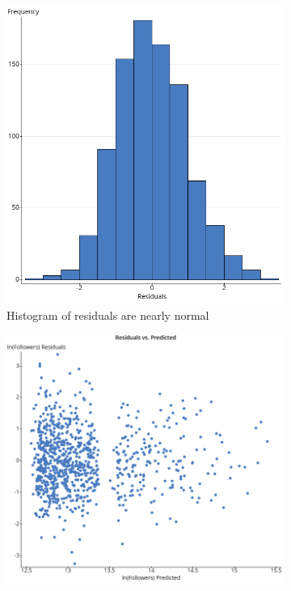 \documentclass[12pt]{article}
\begin{document}
\begin{figure}
    \centering
    \begin{subfigure}{0.45\textwidth}
        \centering
        \includegraphics[width=\textwidth]{../StatCrunch_Results/followers_mature_watch_hrs/residual_histogram}
        \caption{Histogram of residuals are nearly normal}
        \label{fig:plot1}
    \end{subfigure}
    \hfill
    \begin{subfigure}{0.45\textwidth}
        \centering
        \includegraphics[width=\textwidth]{../StatCrunch_Results/followers_mature_watch_hrs/residual_plot}

\end{subfigure}
\end{figure}
\end{document}
